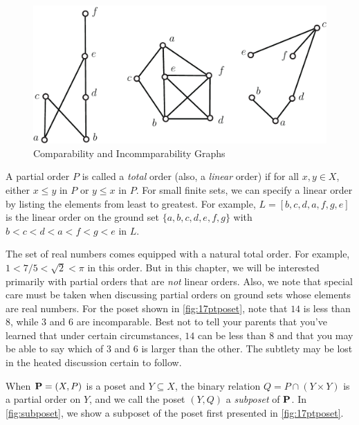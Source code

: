 \begin{figure}
\begin{center}
\includegraphics*[scale=.4]{posets-figs/compincomp.pdf}
\caption{Comparability and Incommparability Graphs}
\label{fig:compincomp}
\end{center}
\end{figure}

A partial order $P$ is called a \textit{total} order (also, a 
\textit{linear} order) if for all $x,y\in X$, either $x\le y$ in $P$
or $y\le x$ in $P$.  For small finite sets, we can specify a linear
order by listing the elements from least to greatest.  For example,
$L=[b,c,d,a,f,g,e]$ is the linear order on the ground set $\{a,b,c,d,e,f,g\}$ with
$b<c<d<a<f<g<e$ in $L$.   

The set of real numbers comes equipped with a natural total order.  For example,
$1<7/5<\sqrt{2}<\pi$ in this order.  But in this chapter, we will be interested
primarily with partial orders that are \textit{not} linear orders.  Also, we note
that special care must be taken when discussing partial orders on ground sets
whose elements are real numbers.  For the poset shown in \autoref{fig:17ptposet}, note
that $14$ is less than $8$, while $3$ and $6$ are incomparable.
Best not to tell your parents that you've learned that under certain circumstances,
$14$ can be less than $8$ and that you may be able to say which of $3$ and $6$ is 
larger than the other.  The subtlety may be lost in the heated 
discussion certain to follow.

When $\mathbf{P}=(X,P)$ is a poset and $Y\subseteq X$, the binary relation
$Q=P\cap(Y\times Y)$ is a partial order on $Y$, and we call the
poset $(Y,Q)$ a \textit{subposet} of $\mathbf{P}$.  In \autoref{fig:subposet},
we show a subposet of the poset first presented in \autoref{fig:17ptposet}.


